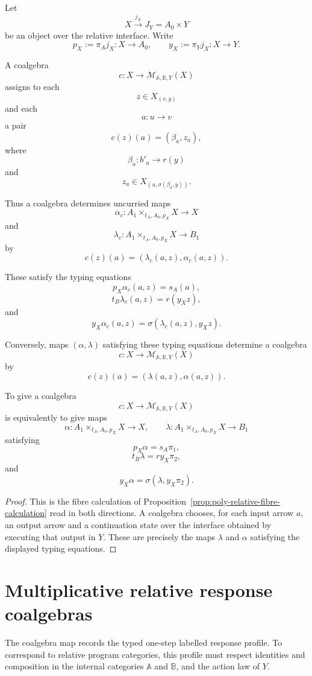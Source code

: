 Let
\[
X\xrightarrow{j_X}J_Y=A_0\times Y
\]
be an object over the relative interface.  Write
\[
p_X:=\pi_Aj_X:X\to A_0,
\qquad
y_X:=\pi_Yj_X:X\to Y.
\]

A coalgebra
\[
c:X\to\mathcal M_{\mathbb A,\mathbb B,Y}(X)
\]
assigns to each
\[
z\in X_{(v,y)}
\]
and each
\[
a:u\to v
\]
a pair
\[
c(z)(a)=(\beta_a,z_a),
\]
where
\[
\beta_a:b'_a\to r(y)
\]
and
\[
z_a\in X_{(u,\sigma(\beta_a,y))}.
\]

Thus a coalgebra determines uncurried maps
\[
\alpha_c:
A_1\times_{t_A,A_0,p_X}X\to X
\]
and
\[
\lambda_c:
A_1\times_{t_A,A_0,p_X}X\to B_1
\]
by
\[
c(z)(a)=(\lambda_c(a,z),\alpha_c(a,z)).
\]

These satisfy the typing equations
\[
p_X\alpha_c(a,z)=s_A(a),
\]
\[
t_B\lambda_c(a,z)=r(y_Xz),
\]
and
\[
y_X\alpha_c(a,z)
=
\sigma(\lambda_c(a,z),y_Xz).
\]

Conversely, maps \((\alpha,\lambda)\) satisfying these typing equations
determine a coalgebra
\[
c:X\to\mathcal M_{\mathbb A,\mathbb B,Y}(X)
\]
by
\[
c(z)(a)=(\lambda(a,z),\alpha(a,z)).
\]

\begin{theorem}
\label{thm:poly-relative-currying-labelled-one-step}
To give a coalgebra
\[
c:X\to\mathcal M_{\mathbb A,\mathbb B,Y}(X)
\]
is equivalently to give maps
\[
\alpha:
A_1\times_{t_A,A_0,p_X}X\to X,
\qquad
\lambda:
A_1\times_{t_A,A_0,p_X}X\to B_1
\]
satisfying
\[
p_X\alpha=s_A\pi_1,
\]
\[
t_B\lambda=r y_X\pi_2,
\]
and
\[
y_X\alpha=\sigma(\lambda,y_X\pi_2).
\]
\end{theorem}

\begin{proof}
This is the fibre calculation of
Proposition~\ref{prop:poly-relative-fibre-calculation} read in both
directions.  A coalgebra chooses, for each input arrow \(a\), an output arrow
and a continuation state over the interface obtained by executing that output
in \(Y\).  These are precisely the maps \(\lambda\) and \(\alpha\) satisfying
the displayed typing equations.
\end{proof}

\section{Multiplicative relative response coalgebras}
\label{sec:poly-relative-multiplicative-coalgebras}

The coalgebra map records the typed one-step labelled response profile.  To
correspond to relative program categories, this profile must respect identities
and composition in the internal categories \(\mathbb A\) and \(\mathbb B\), and
the action law of \(Y\).

